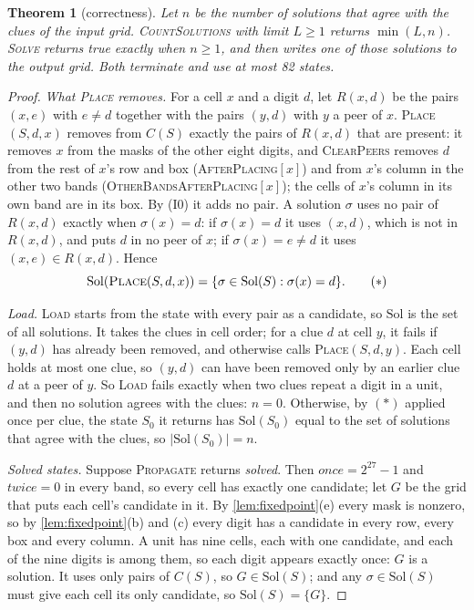 \documentclass[11pt]{article}
\newtheorem{theorem}{Theorem}
\theoremstyle{definition}
\theoremstyle{plain}
\let\origtextsc\textsc
\renewcommand{\textsc}[1]{\textup{\origtextsc{#1}}}
\begin{document}
\begin{theorem}[correctness]
\label{thm:correct}
Let $n$ be the number of solutions that agree with the clues of the input grid. \textsc{CountSolutions} with limit
$L\ge 1$ returns $\min(L, n)$. \textsc{Solve} returns true exactly when $n\ge 1$, and then writes one of those
solutions to the output grid. Both terminate and use at most 82 states.
\end{theorem}
\begin{proof}
\emph{What \textsc{Place} removes.} For a cell $x$ and a digit $d$, let $R(x,d)$ be the pairs $(x,e)$ with $e\neq d$
together with the pairs $(y,d)$ with $y$ a peer of $x$. \textsc{Place}$(S,d,x)$ removes from $C(S)$ exactly the pairs
of $R(x,d)$ that are present: it removes $x$ from the masks of the other eight digits, and \textsc{ClearPeers} removes
$d$ from the rest of $x$'s row and box (\textsc{AfterPlacing}$[x]$) and from $x$'s column in the other two bands
(\textsc{OtherBandsAfterPlacing}$[x]$); the cells of $x$'s column in its own band are in its box. By (I0) it adds no
pair. A solution $\sigma$ uses no pair of $R(x,d)$ exactly when $\sigma(x)=d$: if $\sigma(x)=d$ it uses $(x,d)$, which
is not in $R(x,d)$, and puts $d$ in no peer of $x$; if $\sigma(x)=e\neq d$ it uses $(x,e)\in R(x,d)$. Hence
\[
\mathrm{Sol}(\textsc{Place}(S,d,x))=\{\sigma\in\mathrm{Sol}(S):\sigma(x)=d\}. \tag{$*$}
\]

\emph{Load.} \textsc{Load} starts from the state with every pair as a candidate, so $\mathrm{Sol}$ is the set of all
solutions. It takes the clues in cell order; for a clue $d$ at cell $y$, it fails if $(y,d)$ has already been removed,
and otherwise calls \textsc{Place}$(S,d,y)$. Each cell holds at most one clue, so $(y,d)$ can have been removed only
by an earlier clue $d$ at a peer of $y$. So \textsc{Load} fails exactly when two clues repeat a digit in a unit, and
then no solution agrees with the clues: $n=0$. Otherwise, by $(*)$ applied once per clue, the state $S_0$ it returns
has $\mathrm{Sol}(S_0)$ equal to the set of solutions that agree with the clues, so $|\mathrm{Sol}(S_0)|=n$.

\emph{Solved states.} Suppose \textsc{Propagate} returns \emph{solved}. Then $\mathit{once}=2^{27}-1$ and
$\mathit{twice}=0$ in every band, so every cell has exactly one candidate; let $G$ be the grid that puts each cell's
candidate in it. By \cref{lem:fixedpoint}(e) every mask is nonzero, so by \cref{lem:fixedpoint}(b) and (c) every digit
has a candidate in every row, every box and every column. A unit has nine cells, each with one candidate, and each of
the nine digits is among them, so each digit appears exactly once: $G$ is a solution. It uses only pairs of $C(S)$, so
$G\in\mathrm{Sol}(S)$; and any $\sigma\in\mathrm{Sol}(S)$ must give each cell its only candidate, so
$\mathrm{Sol}(S)=\{G\}$.


\end{proof}
\end{document}
